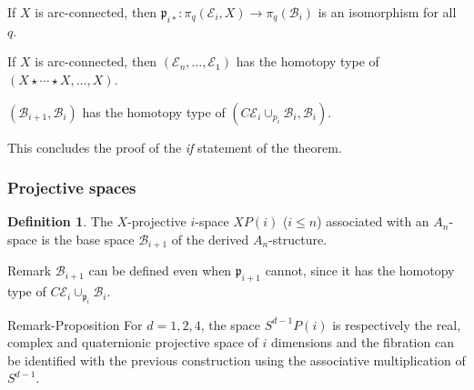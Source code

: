 \documentclass{beamer}
\theoremstyle{definition}
\newtheorem{defi}{Definition}
\begin{document}
\begin{frame}
\begin{theorem}
If $X$ is arc-connected, then $\mathfrak{p}_{i*}:\pi_q(\mathcal{E}_i,X)\to \pi_q(\mathcal{B}_i)$ is an isomorphism for all $q$. %
\end{theorem}\pause

\begin{theorem}
If $X$ is arc-connected, then $(\mathcal{E}_n, \dots, \mathcal{E}_1)$ has the homotopy type of $(X\star\cdots\star X,\dots, X)$. %
\end{theorem}\pause

\begin{theorem}
$(\mathcal{B}_{i+1},\mathcal{B}_i)$ has the homotopy type of $(C\mathcal{E}_i\cup_{p_i}\mathcal{B}_i,\mathcal{B}_i)$. %
\end{theorem}\pause
This concludes the proof of the \emph{if} statement of the theorem.
\end{frame}
\begin{frame}
\frametitle{Projective spaces}
\begin{defi}
The $X$-projective $i$-space $XP(i)$ ($i\leq n$) associated with an $A_n$-space is the base space $\mathcal{B}_{i+1}$ of the derived $A_n$-structure.
\end{defi}\pause
\begin{block}{Remark}
$\mathcal{B}_{i+1}$ can be defined even when $\mathfrak{p}_{i+1}$ cannot, since it has the homotopy type of $C\mathcal{E}_i\cup_{\mathfrak{p}_i}\mathcal{B}_i$.
\end{block}\pause
\begin{block}{Remark-Proposition}%
For $d=1,2,4$, the space $S^{d-1}P(i)$ is respectively the real, complex and quaternionic projective space of $i$ dimensions and the fibration can be identified with the previous construction using the associative multiplication of $S^{d-1}$.
\end{block}
\end{frame}
\end{document}
